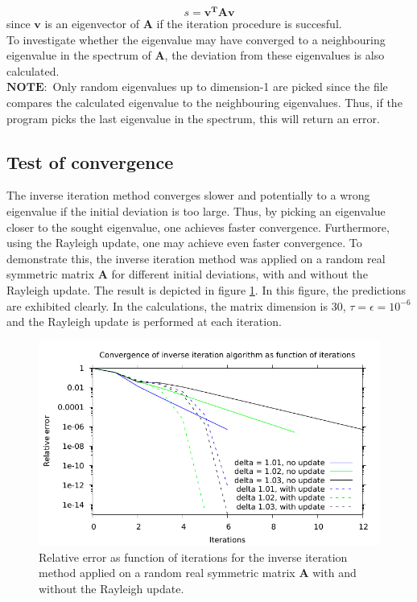 \documentclass{article}
\begin{document}
	\begin{equation}
		s = \mathbf{v^{T}Av}
	\end{equation}
	since $\mathbf{v}$ is an eigenvector of $\mathbf{A}$ if the iteration procedure is succesful.\\
	To investigate whether the eigenvalue may have converged to a neighbouring eigenvalue in the spectrum of $\mathbf{A}$, the deviation from these eigenvalues is also calculated.\\ $\mathbf{NOTE:}$ Only random eigenvalues up to dimension-1 are picked since the file compares the calculated eigenvalue to the neighbouring eigenvalues. Thus, if the program picks the last eigenvalue in the spectrum, this will return an error.
	\subsection*{Test of convergence}
	The inverse iteration method converges slower and potentially to a wrong eigenvalue if the initial deviation is too large. Thus, by picking an eigenvalue closer to the sought eigenvalue, one achieves faster convergence. Furthermore, using the Rayleigh update, one may achieve even faster convergence. To demonstrate this, the inverse iteration method was applied on a random real symmetric matrix $\mathbf{A}$ for different initial deviations, with and without the Rayleigh update. The result is depicted in figure \ref{fig:convergence}. In this figure, the predictions are exhibited clearly. In the calculations, the matrix dimension is 30, $\tau=\epsilon=10^{-6}$ and the Rayleigh update is performed at each iteration.
	\begin{figure}
		\includegraphics[]{../outfiles/Convergence.pdf}
		\caption{Relative error as function of iterations for the inverse iteration method applied on a random real symmetric matrix $\mathbf{A}$ with and without the Rayleigh update.}
		\label{fig:convergence}
	\end{figure}
\end{document}
